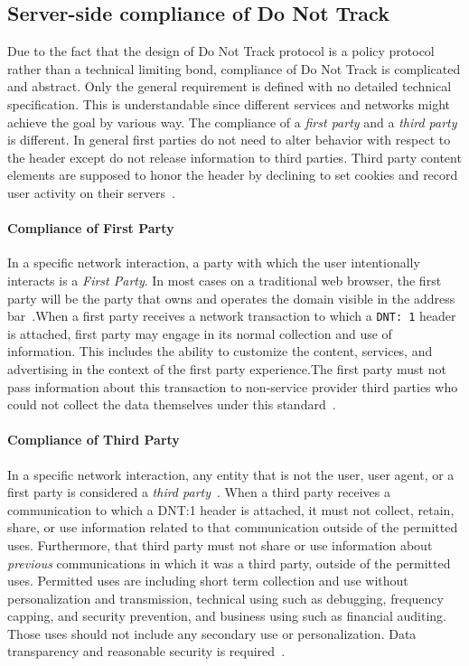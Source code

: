 \documentclass{sig-alternate}
\begin{document}
\subsection*{Server-side compliance of Do Not Track}

Due to the fact that the design of Do Not Track protocol is a policy protocol rather than a technical limiting bond, compliance of Do Not Track is complicated and abstract. Only the general requirement is defined with no detailed technical specification. This is understandable since different services and networks might achieve the goal by various way. The compliance of a \emph{first party} and a \emph{third party} is different. In general first parties do not need to alter behavior with respect to the header except do not release information to third parties. Third party content elements are supposed to honor the header by declining to set cookies and record user activity on their servers~\cite{donotbeg}.

\paragraph{Compliance of First Party}

In a specific network interaction, a party with which the user intentionally interacts is a \emph{First Party}. In most cases on a traditional web browser, the first party will be the party that owns and operates the domain visible in the address bar~\cite{w3ctrackingcompliance}.When a first party receives a network transaction to which a \verb|DNT: 1| header is attached, first party may engage in its normal collection and use of information. This includes the ability to customize the content, services, and advertising in the context of the first party experience.The first party must not pass information about this transaction to non-service provider third parties who could not collect the data themselves under this standard~\cite{w3ctrackingcompliance}.

\paragraph{Compliance of Third Party}

In a specific network interaction, any entity that is not the user, user agent, or a first party is considered a \emph{third party}~\cite{w3ctrackingcompliance}. When a third party receives a communication to which a DNT:1 header is attached, it must not collect, retain, share, or use information related to that communication outside of the permitted uses. Furthermore, that third party must not share or use information about \emph{previous} communications in which it was a third party, outside of the permitted uses. Permitted uses are including short term collection and use without personalization and transmission, technical using such as debugging, frequency capping, and security prevention, and business using such as financial auditing. Those uses should not include any secondary use or personalization. Data transparency and reasonable security is required~\cite{w3ctrackingcompliance}.
\end{document}

